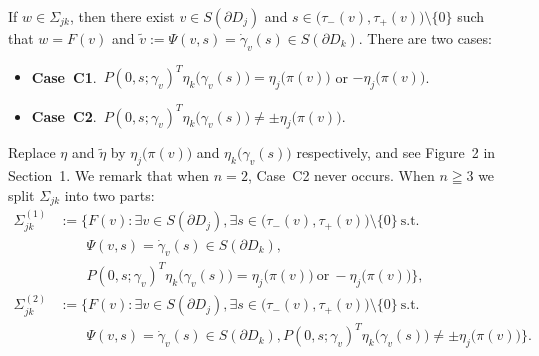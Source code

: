 \documentclass[a4paper,11pt,reqno]{amsart}
\numberwithin{equation}{section}
\theoremstyle{definition}
\theoremstyle{remark}
\begin{document}
%
%
If $w \in \Sigma_{jk}$, 
then there exist $v \in S(\partial{D_j})$ and $s\in\bigl(\tau_-(v),\tau_+(v)\bigr)\setminus\{0\}$ 
such that 
$w=F(v)$ and $\tilde{v}:=\Psi(v,s)=\dot{\gamma}_v(s) \in S(\partial{D_k})$. 
There are two cases:
%
%
\begin{itemize}
\item 
{\bf Case~C1}.\ 
$P(0,s;\gamma_v)^T\eta_k\bigl(\gamma_v(s)\bigr)=\eta_j\bigl(\pi(v)\bigr)$
or 
$-\eta_j\bigl(\pi(v)\bigr)$. 
\item 
{\bf Case~C2}.\ 
$P(0,s;\gamma_v)^T\eta_k\bigl(\gamma_v(s)\bigr){\ne}\pm\eta_j\bigl(\pi(v)\bigr)$. 
\end{itemize}
%
%
Replace $\eta$ and $\tilde{\eta}$ by $\eta_j\bigl(\pi(v)\bigr)$ and $\eta_k\bigl(\gamma_v(s)\bigr)$ respectively, 
and see Figure~2 in Section~1. 
We remark that when $n=2$, Case~C2 never occurs. 
When $n\geqq3$ we split $\Sigma_{jk}$ into two parts:
%
%
\begin{align*}
  \Sigma_{jk}^{(1)}
& :=
  \bigl\{
  F(v): 
  \exists v \in S(\partial{D_j}), 
  \exists s \in \bigl(\tau_-(v),\tau_+(v)\bigr)\setminus\{0\}
  \ \text{s.t.}\
\\ 
& \qquad
  \Psi(v,s)=\dot{\gamma}_v(s) \in S(\partial{D_k}), 
\\ 
& \qquad
  P(0,s;\gamma_v)^T\eta_k\bigl(\gamma_v(s)\bigr) = \eta_j\bigl(\pi(v)\bigr)
  \ \text{or}\ 
  -\eta_j\bigl(\pi(v)\bigr)
  \bigr\}, 
\\
  \Sigma_{jk}^{(2)}
& :=
  \bigl\{
  F(v): 
  \exists v \in S(\partial{D_j}), 
  \exists s \in \bigl(\tau_-(v),\tau_+(v)\bigr)\setminus\{0\}
  \ \text{s.t.}\
\\ 
& \qquad
  \Psi(v,s)=\dot{\gamma}_v(s) \in S(\partial{D_k}), 
  P(0,s;\gamma_v)^T\eta_k\bigl(\gamma_v(s)\bigr)\ne\pm\eta_j\bigl(\pi(v)\bigr)
  \bigr\}.
\end{align*}
\end{document}
